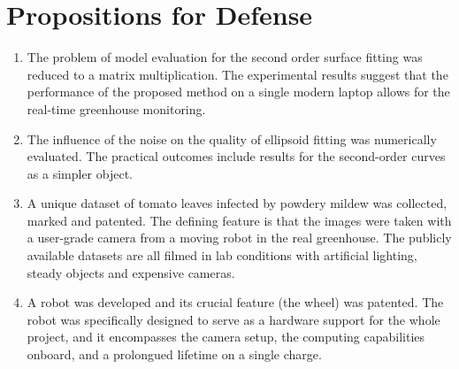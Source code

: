 \section{Propositions for Defense}


\begin{enumerate}
    \item The problem of model evaluation for the second order surface fitting was reduced to a matrix multiplication. The experimental results suggest that the performance of the proposed method on a single modern laptop allows for the real-time greenhouse monitoring.
    \item The influence of the noise on the quality of ellipsoid fitting was numerically evaluated. The practical outcomes include results for the second-order curves as a simpler object.
    \item A unique dataset of tomato leaves infected by powdery mildew was collected, marked and patented. The defining feature is that the images were taken with a user-grade camera from a moving robot in the real greenhouse. The publicly available datasets are all filmed in lab conditions with artificial lighting, steady objects and expensive cameras.
    \item A robot was developed and its crucial feature (the wheel) was patented. The robot was specifically designed to serve as a hardware support for the whole project, and it encompasses the camera setup, the computing capabilities onboard, and a prolongued lifetime on a single charge.
\end{enumerate}

